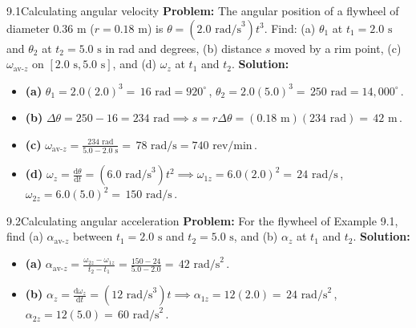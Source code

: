 \documentclass[11pt,a4paper,openany,oneside]{book}
\newcommand{\eqbox}[1]{\boxed{\,#1\,}}
\newcommand{\diff}{\mathrm{d}}
\numberwithin{equation}{chapter}
\newcommand{\bk}[1]{\texorpdfstring{\enspace{\normalfont\small\color{slate}[Book #1]}}{ [Book #1]}}
\begin{document}
\begin{example}{9.1}{Calculating angular velocity\bk{p.\ 281}}
\textbf{Problem:} The angular position of a flywheel of diameter $0.36\text{ m}$ ($r = 0.18\text{ m}$) is $\theta = (2.0\text{ rad/s}^3)t^3$. Find: (a) $\theta_1$ at $t_1 = 2.0\text{ s}$ and $\theta_2$ at $t_2 = 5.0\text{ s}$ in rad and degrees, (b) distance $s$ moved by a rim point, (c) $\omega_{\text{av-}z}$ on $[2.0\text{ s}, 5.0\text{ s}]$, and (d) $\omega_z$ at $t_1$ and $t_2$.
\tcblower
\textbf{Solution:}
\begin{itemize}
  \item \textbf{(a)} $\theta_1 = 2.0(2.0)^3 = \eqbox{16\text{ rad} = 920^\circ}$, $\theta_2 = 2.0(5.0)^3 = \eqbox{250\text{ rad} = 14,000^\circ}$.
  \item \textbf{(b)} $\Delta\theta = 250 - 16 = 234\text{ rad} \implies s = r\Delta\theta = (0.18\text{ m})(234\text{ rad}) = \eqbox{42\text{ m}}$.
  \item \textbf{(c)} $\omega_{\text{av-}z} = \frac{234\text{ rad}}{5.0 - 2.0\text{ s}} = \eqbox{78\text{ rad/s} = 740\text{ rev/min}}$.
  \item \textbf{(d)} $\omega_z = \frac{\diff\theta}{\diff t} = (6.0\text{ rad/s}^3)t^2 \implies \omega_{1z} = 6.0(2.0)^2 = \eqbox{24\text{ rad/s}}$, $\omega_{2z} = 6.0(5.0)^2 = \eqbox{150\text{ rad/s}}$.
\end{itemize}
\end{example}

\begin{example}{9.2}{Calculating angular acceleration\bk{p.\ 283}}
\textbf{Problem:} For the flywheel of Example 9.1, find (a) $\alpha_{\text{av-}z}$ between $t_1 = 2.0\text{ s}$ and $t_2 = 5.0\text{ s}$, and (b) $\alpha_z$ at $t_1$ and $t_2$.
\tcblower
\textbf{Solution:}
\begin{itemize}
  \item \textbf{(a)} $\alpha_{\text{av-}z} = \frac{\omega_{2z} - \omega_{1z}}{t_2 - t_1} = \frac{150 - 24}{5.0 - 2.0} = \eqbox{42\text{ rad/s}^2}$.
  \item \textbf{(b)} $\alpha_z = \frac{\diff\omega_z}{\diff t} = (12\text{ rad/s}^3)t \implies \alpha_{1z} = 12(2.0) = \eqbox{24\text{ rad/s}^2}$, $\alpha_{2z} = 12(5.0) = \eqbox{60\text{ rad/s}^2}$.
\end{itemize}
\end{example}
\end{document}
